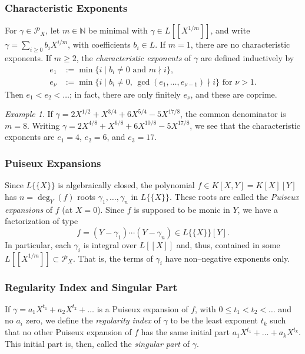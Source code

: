 \documentclass[a4paper,11pt]{amsart}%
\theoremstyle{definition}
\theoremstyle{plain}
\theoremstyle{remark}
\newtheorem{example}[defn]{Example}
\begin{document}
\subsubsection*{Characteristic Exponents}

For $\gamma\in\mathcal{P}_{X}$, let $m\in{\mathbb{N}}$ be minimal with
$\gamma\in L[[X^{1/m}]]$, and write $\gamma=\sum_{i \geq0}b_{i}X^{i/m}$, with
coefficients $b_{i}\in L$. If $m=1$, there are no characteristic exponents. If
$m\geq2$, the {\emph{characteristic exponents}} of $\gamma$ are defined
inductively by
\begin{align*}
e_{1}  &  :=\min\{i \mid b_{i}\neq0\text{ and }m\nmid i\},\\
e_{\nu}  &  :=\min\{i \mid b_{i}\neq0\text{, }\gcd(e_{1},\dots,e_{\nu-1})\nmid
i\}\text{ for }\nu>1\text{.}%
\end{align*}
Then $e_{1} < e_{2} < \dots$; in fact, there are only finitely $e_{\nu}$, and
these are coprime.

\begin{example}
If $\gamma=2X^{1/2}+X^{3/4}+6X^{5/4}-5X^{17/8}$, the common denominator is
$m=8$. Writing $\gamma=2X^{4/8}+X^{6/8}+6X^{10/8}-5X^{17/8}$, we see that the
characteristic exponents are $e_{1}=4$, $e_{2}=6$, and $e_{3}=17$.
\end{example}

\subsubsection*{Puiseux Expansions}

Since $L\{\{X\}\}$ is algebraically closed, the polynomial $f\in
K[X,Y]=K[X][Y]$ has $n=\deg_{Y}(f)$ roots $\gamma_{1},\dots,\gamma_{n}$ in
$L\{\{X\}\}$. These roots are called the \emph{Puiseux expansions} of $f$ (at
$X=0$). Since $f$ is supposed to be monic in $Y$, we have a factorization of
type
\[
f=(Y-\gamma_{1})\cdots(Y-\gamma_{n})\in L\{\{X\}\}[Y].
\]
In particular, each $\gamma_{i}$ is integral over $L[[X]]$ and, thus,
contained in some $L[[X^{1/m}]] \subset{\mathcal{P}_{X}}$. That is, the terms
of $\gamma_{i}$ have non--negative exponents only.

\subsubsection*{Regularity Index and Singular Part}

\noindent If $\gamma= a_{1}X^{t_{1}}+a_{2}X^{t_{2}}+\dots$ is a Puiseux
expansion of $f$, with $0 \le t_{1}<t_{2}<\dots$ and no $a_{i}$ zero, we
define the \emph{regularity index} of $\gamma$ to be the least exponent
$t_{k}$ such that no other Puiseux expansion of $f$ has the same initial part
$a_{1}X^{t_{1}}+\dots+a_{k}X^{t_{k}}$. This initial part is, then, called the
\emph{singular part} of $\gamma$.
\end{document}
